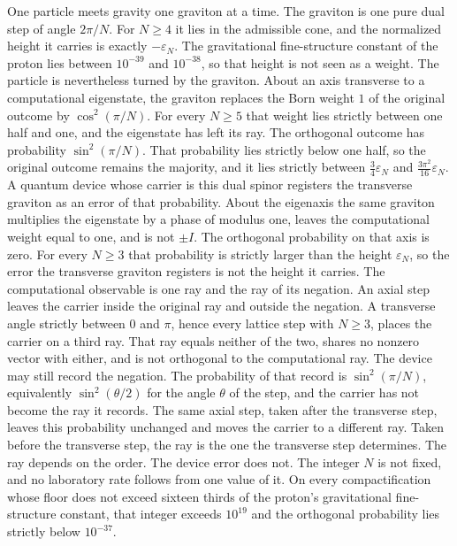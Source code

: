 \documentclass[a4paper]{article}
\begin{document}
One particle meets gravity one graviton at a time. The graviton is one pure dual step of angle \(2\pi/N\). For \(N\ge 4\) it lies in the admissible cone, and the normalized height it carries is exactly \(-\varepsilon_N\). The gravitational fine-structure constant of the proton lies between \(10^{-39}\) and \(10^{-38}\), so that height is not seen as a weight. The particle is nevertheless turned by the graviton. About an axis transverse to a computational eigenstate, the graviton replaces the Born weight \(1\) of the original outcome by \(\cos^2(\pi/N)\). For every \(N\ge 5\) that weight lies strictly between one half and one, and the eigenstate has left its ray. The orthogonal outcome has probability \(\sin^2(\pi/N)\). That probability lies strictly below one half, so the original outcome remains the majority, and it lies strictly between \(\tfrac34\varepsilon_N\) and \(\tfrac{3\pi^2}{16}\varepsilon_N\). A quantum device whose carrier is this dual spinor registers the transverse graviton as an error of that probability. About the eigenaxis the same graviton multiplies the eigenstate by a phase of modulus one, leaves the computational weight equal to one, and is not \(\pm I\). The orthogonal probability on that axis is zero. For every \(N\ge 3\) that probability is strictly larger than the height \(\varepsilon_N\), so the error the transverse graviton registers is not the height it carries. The computational observable is one ray and the ray of its negation. An axial step leaves the carrier inside the original ray and outside the negation. A transverse angle strictly between \(0\) and \(\pi\), hence every lattice step with \(N\ge 3\), places the carrier on a third ray. That ray equals neither of the two, shares no nonzero vector with either, and is not orthogonal to the computational ray. The device may still record the negation. The probability of that record is \(\sin^2(\pi/N)\), equivalently \(\sin^2(\theta/2)\) for the angle \(\theta\) of the step, and the carrier has not become the ray it records. The same axial step, taken after the transverse step, leaves this probability unchanged and moves the carrier to a different ray. Taken before the transverse step, the ray is the one the transverse step determines. The ray depends on the order. The device error does not. The integer \(N\) is not fixed, and no laboratory rate follows from one value of it. On every compactification whose floor does not exceed sixteen thirds of the proton's gravitational fine-structure constant, that integer exceeds \(10^{19}\) and the orthogonal probability lies strictly below \(10^{-37}\).
\end{document}
